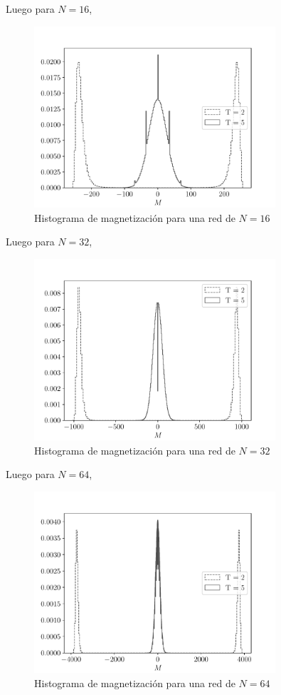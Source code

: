 \documentclass[11pt,a4paper]{article}
\begin{document}
Luego para $N= 16$,
\begin{figure}[H]
    \centering
    \includegraphics[width=0.8\textwidth]{p4/N16_magnetization_hist.pdf}
    \caption{Histograma de magnetización para una red de $N = 16$}
    \label{fig:p4_2}
\end{figure}
\newpage
Luego para $N= 32$,
\begin{figure}[H]
    \centering
    \includegraphics[width=0.8\textwidth]{p4/N32_magnetization_hist.pdf}
    \caption{Histograma de magnetización para una red de $N = 32$}
    \label{fig:p4_3}
\end{figure}

Luego para $N= 64$,
\begin{figure}[H]
    \centering
    \includegraphics[width=0.8\textwidth]{p4/N64_magnetization_hist.pdf}
    \caption{Histograma de magnetización para una red de $N = 64$}
    \label{fig:p4_4}
\end{figure}
\end{document}
